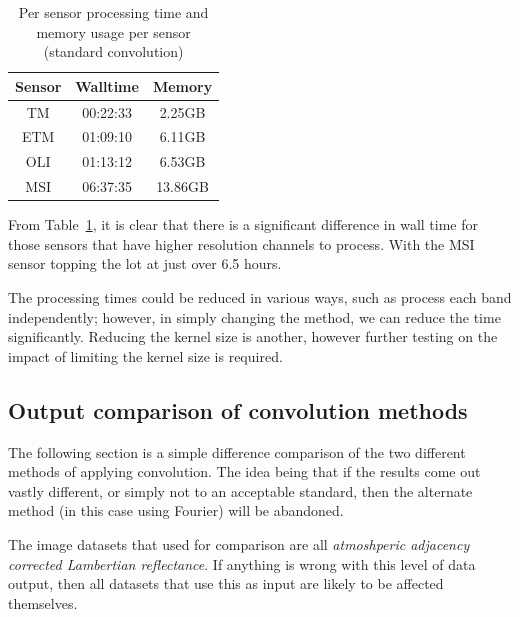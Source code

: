 \documentclass[a4paper]{article}
\begin{document}
    \begin{table}[ht!]
      \caption{Per sensor processing time and memory usage per sensor (standard convolution)}\label{table:3}
      \centering
      \begin{tabular}{ccc} \midrule
        \textbf{Sensor} & \textbf{Walltime} & \textbf{Memory} \\ \midrule
        TM & 00:22:33 & 2.25GB \\
        ETM & 01:09:10 & 6.11GB \\
        OLI & 01:13:12 & 6.53GB \\
        MSI & 06:37:35 & 13.86GB \\ \midrule
      \end{tabular}
    \end{table}

    \begin{flushleft}
      From Table~\ref{table:3}, it is clear that there is a significant difference in wall time for those sensors that have higher resolution channels to process. With the MSI sensor topping the lot at just over 6.5 hours. \par
      The processing times could be reduced in various ways, such as process each band independently; however, in simply changing the method, we can reduce the time significantly. Reducing the kernel size is another, however further testing on the impact of limiting the kernel size is required.
    \end{flushleft}

    \subsection{Output comparison of convolution methods}

    \begin{flushleft}
      The following section is a simple difference comparison of the two different methods of applying convolution. The idea being that if the results come out vastly different, or simply not to an acceptable standard, then the alternate method (in this case using Fourier) will be abandoned. \par
      The image datasets that used for comparison are all \textit{atmoshperic adjacency corrected Lambertian reflectance}. If anything is wrong with this level of data output, then all datasets that use this as input are likely to be affected themselves.
    \end{flushleft}
\end{document}
